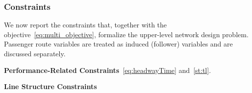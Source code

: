 \documentclass[a4paper,fleqn]{cas-sc}
\begin{document}
\subsubsection{Constraints}
We now report the constraints that, together with the objective~\eqref{eq:multi_objective},
formalize the upper-level network design problem. Passenger route variables are treated as induced (follower) variables and are discussed separately.

\textbf{Performance-Related Constraints}~\eqref{eq:headwayTime} and~\eqref{st:tl}.

\textbf{Line Structure Constraints}
\end{document}
